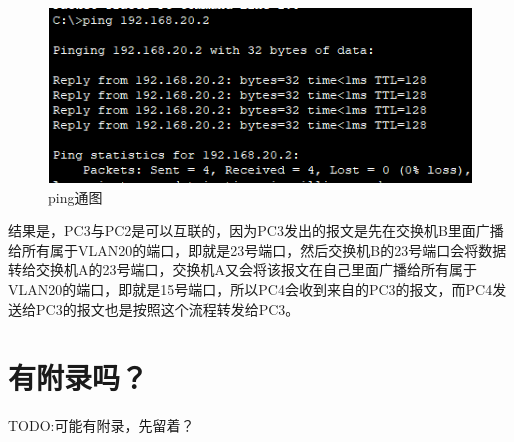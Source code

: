 \documentclass{myreport}
\begin{document}
\begin{figure}[htp]
    \centering
    \includegraphics[width=13cm]{"./figure/6-3x.png"}
    \caption{ping通图}
    \label{fig:e3-ping}
\end{figure}


结果是，PC3与PC2是可以互联的，因为PC3发出的报文是先在交换机B里面广播给所有属于VLAN20的端口，即就是23号端口，然后交换机B的23号端口会将数据转给交换机A的23号端口，交换机A又会将该报文在自己里面广播给所有属于VLAN20的端口，即就是15号端口，所以PC4会收到来自的PC3的报文，而PC4发送给PC3的报文也是按照这个流程转发给PC3。
  




% 
% 

\appendix



\chapter{有附录吗？}

TODO:可能有附录，先留着？

\cleardoublepage
\end{document}
